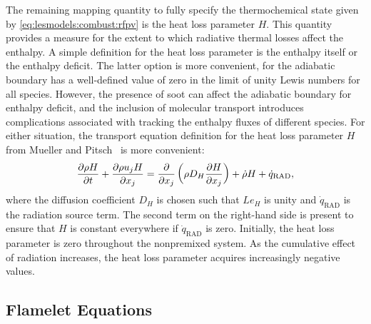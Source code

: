 The remaining mapping quantity to fully specify the thermochemical state given by \cref{eq:lesmodels:combust:rfpv} is the heat loss parameter $H$. This quantity provides a measure for the extent to which radiative thermal losses affect the enthalpy. A simple definition for the heat loss parameter is the enthalpy itself or the enthalpy deficit. The latter option is more convenient, for the adiabatic boundary has a well-defined value of zero in the limit of unity Lewis numbers for all species. However, the presence of soot can affect the adiabatic boundary for enthalpy deficit, and the inclusion of molecular transport introduces complications associated with tracking the enthalpy fluxes of different species. For either situation, the transport equation definition for the heat loss parameter $H$ from Mueller and Pitsch~\cite{mueller2012} is more convenient:
\begin{equation}\label{eq:lesmodels:combust:map:heatloss}
  \trder{H} = \pder[]{x_j}\left( \rho D_H \pder[H]{x_j} \right) + \dot{\rho}H + \dot{q}_{\text{RAD}},
\end{equation}
where the diffusion coefficient $D_H$ is chosen such that $Le_H$ is unity and $\dot{q}_{\text{RAD}}$ is the radiation source term. The second term on the right-hand side is present to ensure that $H$ is constant everywhere if $\dot{q}_{\text{RAD}}$ is zero. Initially, the heat loss parameter is zero throughout the nonpremixed system. As the cumulative effect of radiation increases, the heat loss parameter acquires increasingly negative values.


\subsection{Flamelet Equations}
\label{sec:lesmodels:combust:flamelet}


